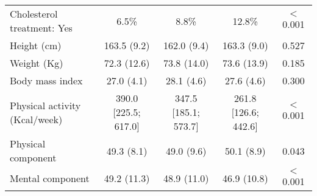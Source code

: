 \begin{longtable}{lcccc}
Cholesterol treatment: Yes &         6.5\%         &         8.8\%         &        12.8\%         &        $<$0.001       \\ 
Height (cm) &     163.5 (9.2)      &     162.0 (9.4)      &     163.3 (9.0)      &        0.527        \\ 
Weight (Kg) &     72.3 (12.6)      &     73.8 (14.0)      &     73.6 (13.9)      &        0.185        \\ 
Body mass index &      27.0 (4.1)      &      28.1 (4.6)      &      27.6 (4.6)      &        0.300        \\ 
Physical activity (Kcal/week) & 390.0 [225.5; 617.0] & 347.5 [185.1; 573.7] & 261.8 [126.6; 442.6] &        $<$0.001       \\ 
Physical component &      49.3 (8.1)      &      49.0 (9.6)      &      50.1 (8.9)      &        0.043        \\ 
Mental component &     49.2 (11.3)      &     48.9 (11.0)      &     46.9 (10.8)      &        $<$0.001        \\ 
 
    \hline
    
    \end{longtable}
